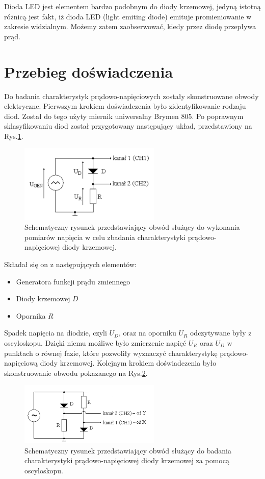 \documentclass[10pt,a4paper]{article}
\begin{document}
Dioda LED jest elementem bardzo podobnym do diody krzemowej, jedyną istotną różnicą jest fakt, iż dioda LED (light emiting diode) emituje promieniowanie w zakresie widzialnym. Możemy zatem zaobserwować, kiedy przez diodę przepływa prąd. 


\section*{Przebieg doświadczenia}
Do badania charakterystyk prądowo-napięciowych zostały skonstruowane obwody elektryczne. Pierwszym krokiem doświadczenia było zidentyfikowanie rodzaju diod. Został do tego użyty miernik uniwersalny Brymen 805. 
Po poprawnym sklasyfikowaniu diod został przygotowany następujący układ, przedstawiony na Rys.\ref{uklad_1}.
\begin{figure}[ht!]	
	\begin{center}
		\includegraphics[width = 0.6\textwidth]{obwod1.png}
		\caption{Schematyczny rysunek przedstawiający obwód służący do wykonania pomiarów napięcia w celu zbadania charakterystyki prądowo-napięciowej diody krzemowej.}
		\label{uklad_1}
	\end{center}
\end{figure}	
Składał się on z następujących elementów: 
\begin{itemize}
\item Generatora funkcji prądu zmiennego
\item Diody krzemowej $D$
\item Opornika $R$
\end{itemize}
Spadek napięcia na diodzie, czyli $U_D$, oraz na oporniku $U_R$ odczytywane były z oscyloskopu.
Dzięki niemu możliwe było zmierzenie napięć $U_R$ oraz $U_D$ w punktach o równej fazie, które pozwoliły wyznaczyć charakterystykę prądowo-napięciową diody krzemowej.
Kolejnym krokiem doświadczenia było skonstruowanie obwodu pokazanego na Rys.\ref{uklad_2}.

\begin{figure}[ht!]	
	\begin{center}
		\includegraphics[width = 0.6\textwidth]{obwod2.png}
		\caption{Schematyczny rysunek przedstawiający obwód służący do badania charakterystyki prądowo-napięciowej diody krzemowej za pomocą 
		oscyloskopu.}
		\label{uklad_2}
	\end{center}
\end{figure}	
\end{document}
